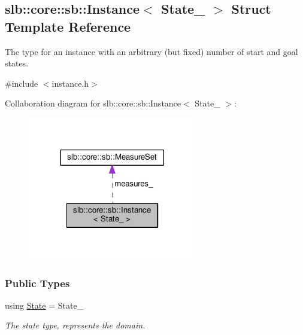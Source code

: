 \hypertarget{structslb_1_1core_1_1sb_1_1Instance}{}\subsection{slb\+:\+:core\+:\+:sb\+:\+:Instance$<$ State\+\_\+ $>$ Struct Template Reference}
\label{structslb_1_1core_1_1sb_1_1Instance}


The type for an instance with an arbitrary (but fixed) number of start and goal states.  




{\ttfamily \#include $<$instance.\+h$>$}



Collaboration diagram for slb\+:\+:core\+:\+:sb\+:\+:Instance$<$ State\+\_\+ $>$\+:\nopagebreak
\begin{figure}[H]
\begin{center}
\leavevmode
\includegraphics[width=209pt]{structslb_1_1core_1_1sb_1_1Instance__coll__graph}
\end{center}
\end{figure}
\subsubsection*{Public Types}
\begin{DoxyCompactItemize}
\item 
using \hyperlink{structslb_1_1core_1_1sb_1_1Instance_a631205b5ee8d1a61a05c0d30f766ef2e}{State} = State\+\_\+\hypertarget{structslb_1_1core_1_1sb_1_1Instance_a631205b5ee8d1a61a05c0d30f766ef2e}{}\label{structslb_1_1core_1_1sb_1_1Instance_a631205b5ee8d1a61a05c0d30f766ef2e}

\begin{DoxyCompactList}\small\item\em The state type, represents the domain. \end{DoxyCompactList}\end{DoxyCompactItemize}
